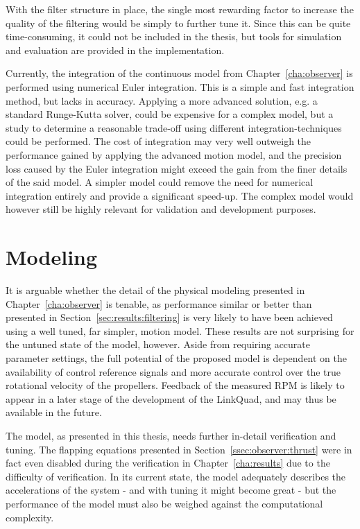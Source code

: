             With the filter structure in place, the single
            most rewarding factor to increase the quality of the filtering
            would be simply to further tune it. Since this can be quite time-consuming,
            it could not be included in the thesis, but tools for simulation
            and evaluation are provided in the implementation.

            Currently, the integration of the continuous model from Chapter~\ref{cha:observer}
            is performed using numerical Euler integration.
            This is a simple and fast integration method, but lacks in accuracy.
            Applying a more advanced solution, e.g. a standard Runge-Kutta solver,
            could be expensive for a complex model, but a study to determine
            a reasonable trade-off using different integration-techniques could be performed.
            The cost of integration may very well outweigh
            the performance gained by applying the advanced motion model,
            and the precision loss caused by the Euler integration might
            exceed the gain from the finer details of the said model.
            A simpler model could remove the need for numerical integration
            entirely and provide a significant speed-up. The complex model
            would however still be highly relevant for validation and
            development purposes.

    \section{Modeling}
        It is arguable whether the detail of the physical modeling presented
        in Chapter~\ref{cha:observer} is tenable, as performance similar or better
        than presented in Section~\ref{sec:results:filtering} is very likely
        to have been achieved using a well tuned, far simpler, motion model.
        These results are not surprising for the untuned state of the model, however.
        Aside from requiring accurate parameter settings, the full potential of the
        proposed model is dependent on the availability of control reference
        signals and more accurate control over the true rotational velocity of
        the propellers. Feedback of the measured RPM is likely to appear in
        a later stage of the development of the LinkQuad, and may thus
        be available in the future.

        The model, as presented in this thesis, needs further in-detail
        verification and tuning. The flapping equations presented in
        Section~\ref{ssec:observer:thrust} were in fact even disabled during
        the verification in Chapter~\ref{cha:results} due to the
        difficulty of verification. In its current state, the model
        adequately describes the accelerations of the system - and with tuning it might become great -
        but the performance of the model must also be weighed against
        the computational complexity.


